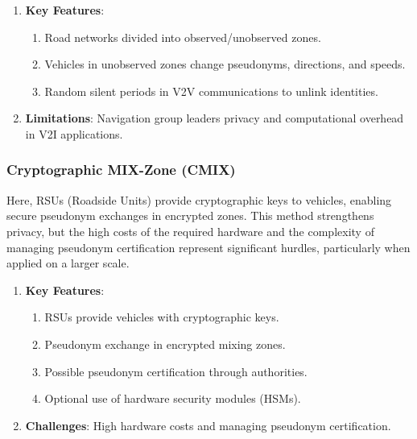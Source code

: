 \begin{enumerate}
    \item \textbf{Key Features}:
    \begin{enumerate}
        \item Road networks divided into observed/unobserved zones.
        \item Vehicles in unobserved zones change pseudonyms, directions, and speeds.
        \item Random silent periods in V2V communications to unlink identities.
    \end{enumerate}
    \item \textbf{Limitations}: Navigation group leaders privacy and computational overhead in V2I applications.
\end{enumerate}

\subsubsection{Cryptographic MIX-Zone (CMIX)}
Here, RSUs (Roadside Units) provide cryptographic keys to vehicles, enabling secure pseudonym exchanges in encrypted zones.
This method strengthens privacy, but the high costs of the required hardware and the complexity of managing pseudonym certification represent significant hurdles, particularly when applied on a larger scale.
\begin{enumerate}
    \item \textbf{Key Features}:
    \begin{enumerate}
        \item RSUs provide vehicles with cryptographic keys.
        \item Pseudonym exchange in encrypted mixing zones.
        \item Possible pseudonym certification through authorities.
        \item Optional use of hardware security modules (HSMs).
    \end{enumerate}
    \item \textbf{Challenges}: High hardware costs and managing pseudonym certification.
\end{enumerate}

